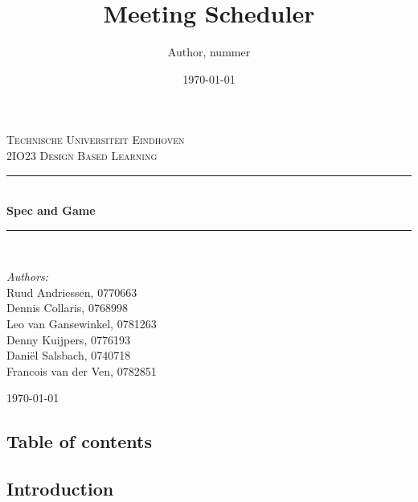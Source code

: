 \documentclass[a4paper,twoside,11pt]{article}
\title{\vspace{-\baselineskip}\sffamily\bfseries Meeting Scheduler}
\author{Author, nummer}
\date{\today}
\newcommand{\HRule}{\rule{\linewidth}{0.5mm}}
\begin{document}

\begin{titlepage}

\begin{center}

 

\textsc{\LARGE Technische Universiteit Eindhoven}\\[1.5cm]

\textsc{\Large 2IO23 Design Based Learning}\\[0.5cm]


\HRule \\[0.4cm]
{ \huge \bfseries Spec and Game}\\[0.4cm]
\HRule \\[1.5cm]

\begin{minipage}{0.4\textwidth}
\begin{flushleft} \large
\emph{Authors:}\\
Ruud Andriessen, 0770663\\
Dennis Collaris, 0768998\\
Leo van Gansewinkel, 0781263\\
Denny Kuijpers, 0776193\\
Daniël Salsbach, 0740718\\
Francois van der Ven, 0782851
\end{flushleft}
\end{minipage}
\begin{minipage}{0.4\textwidth}
\begin{flushright} \large

\end{flushright}
\end{minipage}
\vfill
{\large \today}
\end{center}
\end{titlepage}

\begin{center}
\section{Table of contents}
\end{center}
\tableofcontents
\newpage
\begin{center}
\section{Introduction}
\end{center}
\end{document}
